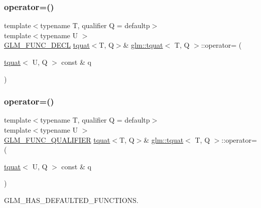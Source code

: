 \mbox{\label{structglm_1_1tquat_ab460ca35b5d2a4afe8fc79106943f456}} 
\subsubsection{\texorpdfstring{operator=()}{operator=()}\hspace{0.1cm}{\footnotesize\ttfamily [2/3]}}
{\footnotesize\ttfamily template$<$typename T, qualifier Q = defaultp$>$ \\
template$<$typename U $>$ \\
\mbox{\hyperlink{setup_8hpp_ab2d052de21a70539923e9bcbf6e83a51}{G\+L\+M\+\_\+\+F\+U\+N\+C\+\_\+\+D\+E\+CL}} \mbox{\hyperlink{structglm_1_1tquat}{tquat}}$<$T, Q$>$\& \mbox{\hyperlink{structglm_1_1tquat}{glm\+::tquat}}$<$ T, Q $>$\+::operator= (\begin{DoxyParamCaption}\item[{\mbox{\hyperlink{structglm_1_1tquat}{tquat}}$<$ U, Q $>$ const \&}]{q }\end{DoxyParamCaption})}

\mbox{\label{structglm_1_1tquat_abbfc6f4a48d94487207b0aef77a2809c}} 
\subsubsection{\texorpdfstring{operator=()}{operator=()}\hspace{0.1cm}{\footnotesize\ttfamily [3/3]}}
{\footnotesize\ttfamily template$<$typename T, qualifier Q = defaultp$>$ \\
template$<$typename U $>$ \\
\mbox{\hyperlink{setup_8hpp_a33fdea6f91c5f834105f7415e2a64407}{G\+L\+M\+\_\+\+F\+U\+N\+C\+\_\+\+Q\+U\+A\+L\+I\+F\+I\+ER}} \mbox{\hyperlink{structglm_1_1tquat}{tquat}}$<$T, Q$>$\& \mbox{\hyperlink{structglm_1_1tquat}{glm\+::tquat}}$<$ T, Q $>$\+::operator= (\begin{DoxyParamCaption}\item[{\mbox{\hyperlink{structglm_1_1tquat}{tquat}}$<$ U, Q $>$ const \&}]{q }\end{DoxyParamCaption})}



G\+L\+M\+\_\+\+H\+A\+S\+\_\+\+D\+E\+F\+A\+U\+L\+T\+E\+D\+\_\+\+F\+U\+N\+C\+T\+I\+O\+NS. 

